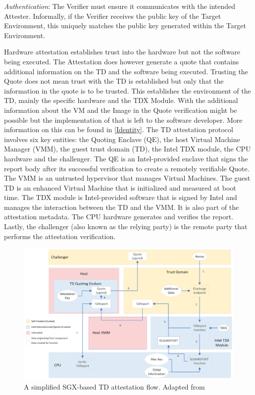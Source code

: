 \textit{Authentication}: The Verifier must ensure it communicates with the intended Attester. Informally, if the Verifier receives the public key of the Target Environment, this uniquely matches the public key generated within the Target Environment.

Hardware attestation establishes trust into the hardware but not the software being executed. The Attestation does however generate a quote that contains additional information on the TD and the software being executed. Trusting the Quote does not mean trust with the TD is established but only that the information in the quote is to be trusted. This establishes the environment of the TD, mainly the specific hardware and the TDX Module. With the additional information about the VM and the Image in the Quote verification might be possible but the implementation of that is left to the software developer. More information on this can be found in \ref{Identity}.
The TD attestation protocol involves six key entities: the Quoting Enclave (QE), the host Virtual Machine Manager (VMM), the guest trust domain (TD), the Intel TDX module, the CPU hardware and the challenger. The QE is an Intel-provided enclave that signs the report body after its successful verification to create a remotely verifiable Quote. The VMM is an untrusted hypervisor that manages Virtual Machines. The guest TD is an enhanced Virtual Machine that is initialized and measured at boot time. The TDX module is Intel-provided software that is signed by Intel and manages the interaction between the TD and the VMM. It is also part of the attestation metadata. The CPU hardware generates and verifies the report. Lastly, the challenger (also known as the relying party) is the remote party that performs the attestation verification.
\begin{figure}
\centering
\includegraphics[width=\textwidth]{figures/Attestation-einfach.png}
\caption{A simplified SGX-based TD attestation flow. Adapted from \cite[p.~111]{noauthor_tdx-module-10-public-specpdf_nodate}}
\label{fig:EasyAttestation}
\end{figure}
